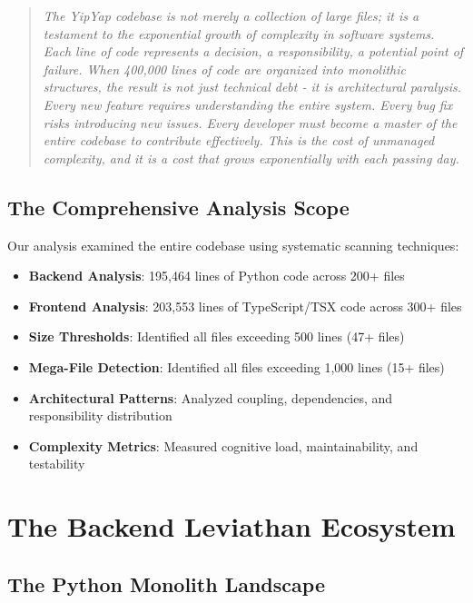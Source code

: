 \documentclass[11pt]{article}
\begin{document}
\begin{quote}
\emph{The YipYap codebase is not merely a collection of large files; it is a testament to the exponential growth of complexity in software systems. Each line of code represents a decision, a responsibility, a potential point of failure. When 400,000 lines of code are organized into monolithic structures, the result is not just technical debt - it is architectural paralysis. Every new feature requires understanding the entire system. Every bug fix risks introducing new issues. Every developer must become a master of the entire codebase to contribute effectively. This is the cost of unmanaged complexity, and it is a cost that grows exponentially with each passing day.}
\end{quote}

\subsection{The Comprehensive Analysis Scope}

Our analysis examined the entire codebase using systematic scanning techniques:

\begin{itemize}
\item \textbf{Backend Analysis}: 195,464 lines of Python code across 200+ files
\item \textbf{Frontend Analysis}: 203,553 lines of TypeScript/TSX code across 300+ files
\item \textbf{Size Thresholds}: Identified all files exceeding 500 lines (47+ files)
\item \textbf{Mega-File Detection}: Identified all files exceeding 1,000 lines (15+ files)
\item \textbf{Architectural Patterns}: Analyzed coupling, dependencies, and responsibility distribution
\item \textbf{Complexity Metrics}: Measured cognitive load, maintainability, and testability
\end{itemize}

\section{The Backend Leviathan Ecosystem}

\subsection{The Python Monolith Landscape}
\end{document}
